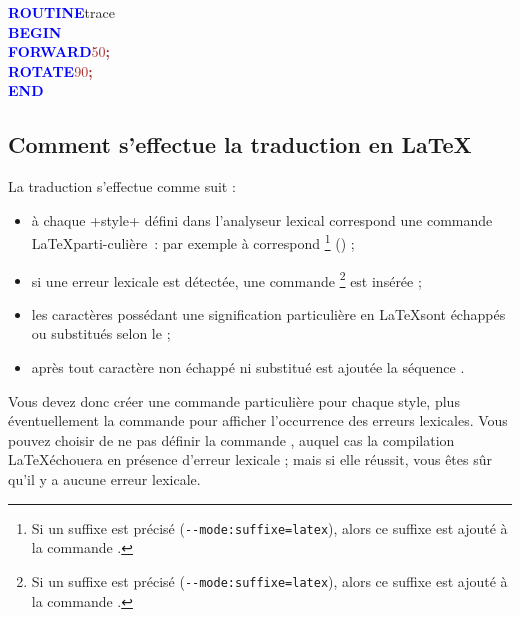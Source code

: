 {

\begin{siderulesRed}
\ttfamily
\textcolor{blue}{\bf ROUTINE}\hspace*{.6em}t{}r{}a{}c{}e{} \\
\textcolor{blue}{\bf BEGIN} \\
\hspace*{1.2em}\textcolor{blue}{\bf FORWARD}\hspace*{.6em}\textcolor{brown}{5{}0{}}\textcolor{brown}{\bf ;} \\
\hspace*{1.2em}\textcolor{blue}{\bf ROTATE}\hspace*{.6em}\textcolor{brown}{9{}0{}}\textcolor{brown}{\bf ;} \\
\textcolor{blue}{\bf END}
\end{siderulesRed}
}

\subsection{Comment s'effectue la traduction en \LaTeX}

La traduction s'effectue comme suit :
\begin{itemize}
  \item à chaque \ggs+style+ défini dans l'analyseur lexical correspond une commande \LaTeX parti-culière~: par exemple à  correspond \footnote{Si un suffixe est précisé (\texttt{-{}-mode:suffixe=latex}), alors ce suffixe est ajouté à la commande .} () ;
  \item si une erreur lexicale est détectée, une commande \footnote{Si un suffixe est précisé (\texttt{-{}-mode:suffixe=latex}), alors ce suffixe est ajouté à la commande .} est insérée ;
  \item les caractères possédant une signification particulière en \LaTeX sont échappés ou substitués selon le  ;
  \item après tout caractère non échappé ni substitué est ajoutée la séquence \tpp{\{\}}.
\end{itemize}

Vous devez donc créer une commande particulière pour chaque style, plus éventuellement la commande  pour afficher l'occurrence des erreurs lexicales. Vous pouvez choisir de ne pas définir la commande , auquel cas la compilation \LaTeX échouera en présence d'erreur lexicale ; mais si elle réussit, vous êtes sûr qu'il y a aucune erreur lexicale.

